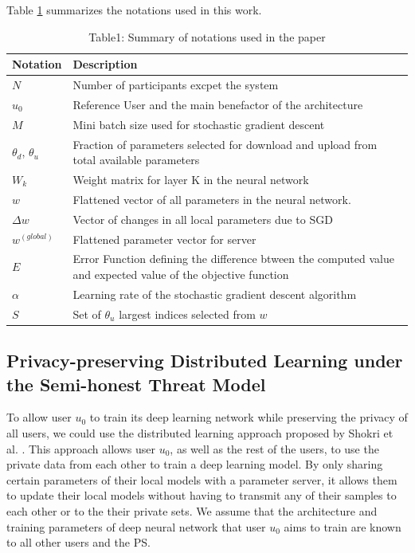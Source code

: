 \documentclass[conference]{IEEEtran}
\begin{document}
Table \ref{table:1} summarizes the notations used in this work.
\begin{table}[!h]
\centering
\caption{Table1: Summary of notations used in the paper}
\label{table:1}
\begin{tabular}{ | m{} | m{}| } 
\hline
\textbf{Notation} & \textbf{Description} \\
 \hline\hline

$N$ & Number of participants excpet the system\\
\hline
$u_0$ & Reference User and the  main benefactor of the architecture \\
\hline
$M$ & Mini batch size used for stochastic gradient descent\\
\hline
$\theta_d$, $\theta_u$ & Fraction of parameters selected for download and upload from total available parameters \\
\hline
$W_k$ & Weight matrix for layer K in the neural network\\
\hline
$w$ & Flattened vector of all parameters in the neural network. \\
\hline
$\Delta w$ & Vector of changes in all local parameters due to SGD\\
\hline
$w^{(global)}$ & Flattened parameter vector for server\\
\hline
$E$ & Error Function defining the difference btween the computed value and expected value of the objective function \\
\hline
$\alpha$ & Learning rate of the stochastic gradient descent algorithm\\
\hline
$S$ & Set of $\theta_u$ largest indices selected from $w$ \\
\hline
\end{tabular}
\end{table}
\subsection{Privacy-preserving Distributed Learning under the Semi-honest Threat Model}
To allow user $u_0$ to train its deep learning network while preserving the privacy of all users, we could use the distributed
learning approach proposed by Shokri et al. \cite{shokri2015privacy}. This approach allows user $u_0$, as well as the rest of the users, 
to use the private data from each other to train a deep learning model. By only sharing certain parameters of their local models
with a parameter server, it allows them to update their local models without having to transmit any of their samples to each other
or to the their private sets. We assume that the architecture and training parameters of  deep neural network that user $u_0$ aims to
train are known  to all other users and the PS.
\end{document}
